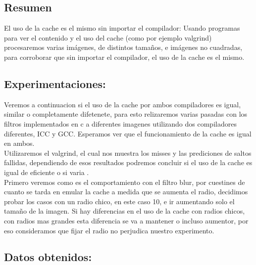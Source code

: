 \subsection{Resumen}

El uso de la cache es el mismo sin importar el compilador: Usando programas para ver el contenido y el uso del cache (como por ejemplo valgrind) procesaremos varias imágenes, de distintos tamaños, e imágenes no cuadradas, para corroborar que sin importar el compilador, el uso de la cache es el mismo. \\


\subsection{Experimentaciones:}

Veremos a continuacion si el uso de la cache por ambos compiladores es igual, similar o completamente difetenete, para esto relizaremos varias pasadas con los filtros implementados en c a diferentes imagenes utilizando dos compiladores diferentes, ICC y GCC. Esperamos ver que el funcionamiento de la cache es igual en ambos. \\

Utilizaremos el valgrind, el cual nos muestra los misses y las prediciones de saltos fallidas, dependiendo de esos resultados podremos concluir si el uso de la cache es igual de eficiente o si varia . \\

Primero veremos como es el comportamiento con el filtro blur, por cuestines de cuanto se tarda en emular la cache a medida que se aumenta el radio, decidimos probar los casos con un radio chico, en este caso 10,  e ir aumentando solo el tamaño de la imagen. Si hay diferencias en el uso de la cache con radios chicos, con radios mas grandes esta diferencia se va a mantener o incluso aumentor, por eso consideramos que fijar el radio no perjudica nuestro experimento. \\

\subsection{Datos obtenidos:}

